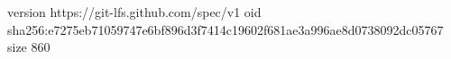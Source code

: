 version https://git-lfs.github.com/spec/v1
oid sha256:e7275eb71059747e6bf896d3f7414c19602f681ae3a996ae8d0738092dc05767
size 860
